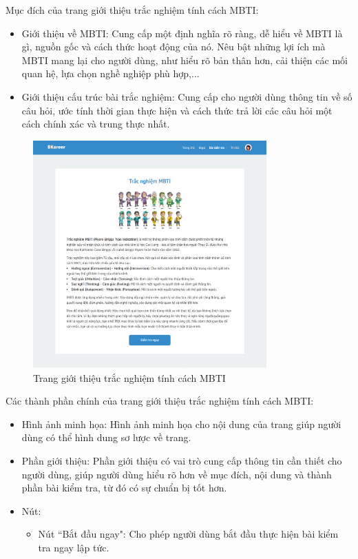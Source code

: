 Mục đích của trang giới thiệu trắc nghiệm tính cách MBTI:
\begin{itemize}
    \item Giới thiệu về MBTI: Cung cấp một định nghĩa rõ ràng, dễ hiểu về MBTI là gì, nguồn gốc và cách thức hoạt động của nó. Nêu bật những lợi ích mà MBTI mang lại cho người dùng, như hiểu rõ bản thân hơn, cải thiện các mối quan hệ, lựa chọn nghề nghiệp phù hợp,...
    \item Giới thiệu cấu trúc bài trắc nghiệm: Cung cấp cho người dùng thông tin về số câu hỏi, ước tính thời gian thực hiện và cách thức trả lời các câu hỏi một cách chính xác và trung thực nhất.
\end{itemize}

\begin{figure}[H]
    \centering
    \includegraphics[width=0.8\textwidth]
    {images/chap5/mbtiDetail.png}
    \vspace{0.5cm}
    \caption{Trang giới thiệu trắc nghiệm tính cách MBTI}
\end{figure}

Các thành phần chính của trang giới thiệu trắc nghiệm tính cách MBTI:
\begin{itemize}
    \item Hình ảnh minh họa: Hình ảnh minh họa cho nội dung của trang giúp người dùng có thể hình dung sơ lược về trang.
    \item Phần giới thiệu: Phần giới thiệu có vai trò cung cấp thông tin cần thiết cho người dùng, giúp người dùng hiểu rõ hơn về mục đích, nội dung và thành phần bài kiểm tra, từ đó có sự chuẩn bị tốt hơn.
    \item Nút:
        \begin{itemize}
            \item Nút ``Bắt đầu ngay": Cho phép người dùng bắt đầu thực hiện bài kiểm tra ngay lập tức.
        \end{itemize}
\end{itemize}

